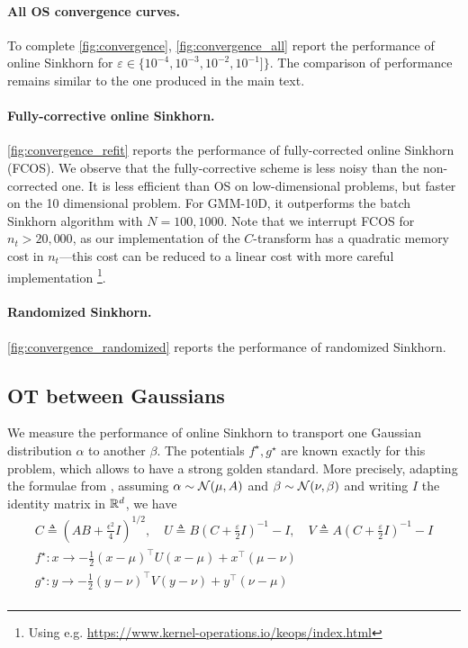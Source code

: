 \paragraph{All OS convergence curves.} To complete \autoref{fig:convergence},
\autoref{fig:convergence_all} report the performance of online Sinkhorn for
$\varepsilon \in \{10^{-4}, 10^{-3}, 10^{-2}, 10^{-1}]\}$. The comparison of
performance remains similar to the one produced in the main text.

\paragraph{Fully-corrective online Sinkhorn.}\autoref{fig:convergence_refit} reports the performance of
fully-corrected online Sinkhorn (FCOS). We observe that the fully-corrective scheme is less noisy than the
non-corrected one. It is less efficient than OS on low-dimensional problems,
but faster on the 10 dimensional problem. For GMM-10D, it outperforms the batch Sinkhorn algorithm
with $N=100, 1000$. Note that we interrupt FCOS for $n_t > 20,000$, as our implementation of the $C$-transform has a quadratic memory cost in $n_t$---this cost can be reduced to a linear cost with more careful implementation \footnote{Using e.g. \url{https://www.kernel-operations.io/keops/index.html}}.

\paragraph{Randomized Sinkhorn.}\autoref{fig:convergence_randomized} reports the
performance of randomized Sinkhorn.

\subsection{OT between Gaussians}

We measure the performance of online Sinkhorn to transport one Gaussian
distribution $\alpha$ to another $\beta$. The potentials $f^\star, g^\star$ are
known exactly for this problem, which allows to have a strong golden standard.
More precisely, adapting the formulae from \cite{janati_entropic_2020}, assuming
$\alpha \sim \mathcal{N}(\mu, A)$ and $\beta \sim \mathcal{N}(\nu, \beta)$ and writing $I$ the
identity matrix in $\mathbb{R}^d$, we have
\begin{gather}
    C \triangleq (A B + \frac{\epsilon^2}{4} I)^{1/2}, \quad
    U \triangleq B (C + \frac{\varepsilon}{2} I)^{-1} - I,\quad
    V \triangleq A (C + \frac{\varepsilon}{2} I)^{-1} - I \\
    f^\star: x \to - \frac{1}{2} (x - \mu)^\top U (x - \mu) + x^\top (\mu - \nu) \\
    g^\star: y \to - \frac{1}{2} (y - \nu)^\top V (y - \nu) + y^\top (\nu - \mu) \\
\end{gather}

